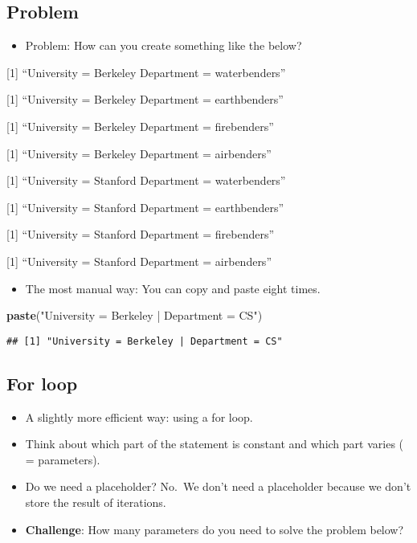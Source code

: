 \documentclass[
]{book}
\newenvironment{Shaded}{\begin{snugshade}}{\end{snugshade}}
\newcommand{\KeywordTok}[1]{\textcolor[rgb]{0.13,0.29,0.53}{\textbf{#1}}}
\newcommand{\NormalTok}[1]{#1}
\newcommand{\StringTok}[1]{\textcolor[rgb]{0.31,0.60,0.02}{#1}}
\providecommand{\tightlist}{%
  \setlength{\itemsep}{0pt}\setlength{\parskip}{0pt}}
\begin{document}
\hypertarget{problem}{%
\subsection{Problem}\label{problem}}

\begin{itemize}
\tightlist
\item
  Problem: How can you create something like the below?
\end{itemize}

{[}1{]} ``University = Berkeley \textbar{} Department = waterbenders''

{[}1{]} ``University = Berkeley \textbar{} Department = earthbenders''

{[}1{]} ``University = Berkeley \textbar{} Department = firebenders''

{[}1{]} ``University = Berkeley \textbar{} Department = airbenders''

{[}1{]} ``University = Stanford \textbar{} Department = waterbenders''

{[}1{]} ``University = Stanford \textbar{} Department = earthbenders''

{[}1{]} ``University = Stanford \textbar{} Department = firebenders''

{[}1{]} ``University = Stanford \textbar{} Department = airbenders''

\begin{itemize}
\tightlist
\item
  The most manual way: You can copy and paste eight times.
\end{itemize}

\begin{Shaded}
\begin{Highlighting}[]
\KeywordTok{paste}\NormalTok{(}\StringTok{"University = Berkeley | Department = CS"}\NormalTok{)}
\end{Highlighting}
\end{Shaded}

\begin{verbatim}
## [1] "University = Berkeley | Department = CS"
\end{verbatim}

\hypertarget{for-loop-1}{%
\subsection{For loop}\label{for-loop-1}}

\begin{itemize}
\item
  A slightly more efficient way: using a for loop.
\item
  Think about which part of the statement is constant and which part varies ( = parameters).\\
\item
  Do we need a placeholder? No.~We don't need a placeholder because we don't store the result of iterations.
\item
  \textbf{Challenge}: How many parameters do you need to solve the problem below?
\end{itemize}
\end{document}
